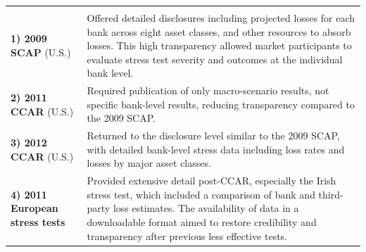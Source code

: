 
\noindent\begin{minipage}{\textwidth}
\renewcommand{\arraystretch}{1.32}
\begin{tabularx}{\textwidth}{@{}L{0.26\textwidth}Y@{}}
  & \\
{\tabfont \textbf{1) 2009 SCAP} (U.S.)} &
{\tabfont Offered detailed disclosures including projected losses for each bank
across eight asset classes, and other resources to absorb losses. This high
transparency allowed market participants to evaluate stress test severity and
outcomes at the individual bank level.}\\
{\tabfont \textbf{2) 2011 CCAR} (U.S.)} &
{\tabfont Required publication of only macro-scenario results, not specific
bank-level results, reducing transparency compared to the 2009 SCAP.}\\
{\tabfont \textbf{3) 2012 CCAR} (U.S.)} &
{\tabfont Returned to the disclosure level similar to the 2009 SCAP, with detailed
bank-level stress data including loss rates and losses by major asset classes.}\\
{\tabfont \textbf{4) 2011 European stress tests}} &
{\tabfont Provided extensive detail post-CCAR, especially the Irish stress test,
which included a comparison of bank and third-party loss estimates. The
availability of data in a downloadable format aimed to restore credibility and
transparency after previous less effective tests.}\\
\end{tabularx}
\end{minipage}
